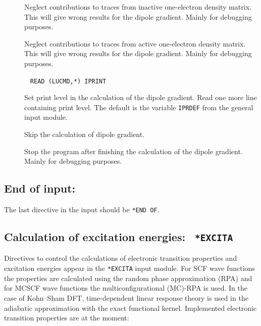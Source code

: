 \begin{description}
\item[] Neglect contributions to traces from
inactive one-electron density matrix. This will give wrong results for
the dipole gradient. Mainly for debugging purposes.

\item[] Neglect contributions to traces from
active one-electron density matrix. This will give wrong results for the
dipole gradient. Mainly for debugging purposes.

\item[]\verb| |\newline
\verb|READ (LUCMD,*) IPRINT|

Set print level in the calculation of the dipole gradient.  Read one more
line containing print level. The default 
is the variable \verb|IPRDEF| from the general input module.

\item[] Skip the calculation of dipole gradient.


\item[] Stop the program after finishing the calculation
of the dipole gradient. Mainly for debugging purposes.
\end{description}

\subsection{End of input: }

The last directive in the input should be \verb|*END OF|.

\subsection{Calculation of excitation energies: {\tt
*EXCITA}}\label{sec:excita}

Directives to control the calculations of electronic
transition
properties and excitation energies appear in
the \verb|*EXCITA| input 
module. For SCF wave
functions the properties are calculated using the 
random phase approximation (RPA) and for MCSCF wave functions the
multiconfigurational (MC)-RPA is used. In the case of Kohn--Sham DFT, time-dependent linear response theory is used in the adiabatic approximation with the exact functional kernel. Implemented electronic transition
properties are at the moment:

